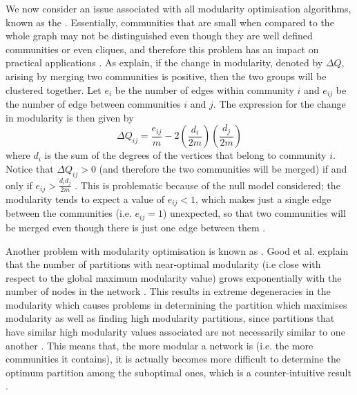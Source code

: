 We now consider an issue associated with all modularity optimisation algorithms, known as the  \cite{GMC10,For10}.
Essentially, communities that are small when compared to the whole graph may not be distinguished even though they are well defined communities or even cliques, and therefore this problem has an impact on practical applications \cite{For10}.
As \cite{GMC10,For10} explain, if the change in modularity, denoted by $\Delta Q$, arising by merging two communities is positive, then the two groups will be clustered together.
Let $e_{i}$ be the number of edges within community $i$ and $e_{ij}$ be the number of edge between communities $i$ and $j$.
The expression for the change in modularity is then given by
\begin{equation}
	\label{eq:resolutionLimit}
	\Delta Q_{ij} = \frac{e_{ij}}{m} -2 \left( \frac{d_{i}}{2m} \right) \left( \frac{d_{j}}{2m} \right)
\end{equation}
where $d_{i}$ is the sum of the degrees of the vertices that belong to community $i$.
Notice that $\Delta Q_{ij} > 0$ (and therefore the two communities will be merged) if and only if $e_{ij} > \frac{d_{i}d_{j}}{2m}$ \cite{GMC10}.
This is problematic because of the null model considered; the modularity tends to expect a value of $e_{ij} < 1$, which makes just a single edge between the communities (i.e. $e_{ij}=1$) unexpected, so that two communities will be merged even though there is just one edge between them \cite{GMC10}.

Another problem with modularity optimisation is known as  \cite{GMC10,For10}.
Good et al. \cite{GMC10} explain that the number of partitions with near-optimal modularity (i.e close with respect to the global maximum modularity value) grows exponentially with the number of nodes in the network \cite{For10}.
This results in extreme degeneracies in the modularity which causes problems in determining the partition which maximises modularity as well as finding high modularity partitions, since partitions that have similar high modularity values associated are not necessarily similar to one another \cite{For10,GMC10}.
This means that, the more modular a network is (i.e. the more communities it contains), it is actually becomes more difficult to determine the optimum partition among the suboptimal ones, which is a counter-intuitive result \cite{GMC10}.

